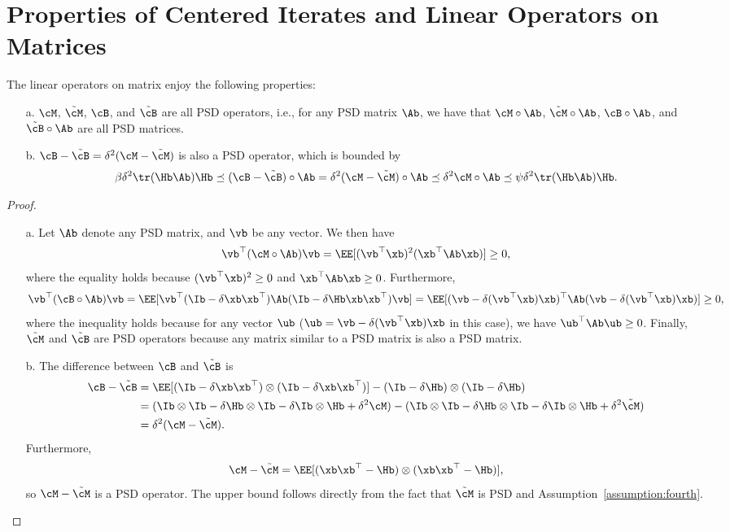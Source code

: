 \documentclass[11pt]{article}
\begin{document}
\section{Properties of Centered Iterates and Linear Operators on Matrices}\label{section:linear_operator_property}

\begin{lemma}\label{lemma:linear_operator_properties}
The linear operators on matrix enjoy the following properties:
\begin{itemize}[leftmargin=*]
\item[a.] $\cM$, $\tilde\cM$, $\cB$, and $\tilde\cB$ are all PSD operators, i.e., for any PSD matrix $\Ab$, we have that $\cM\circ\Ab$, $\tilde\cM\circ\Ab$, $\cB\circ\Ab$, and $\tilde\cB\circ\Ab$ are all PSD matrices.
\item[b.] $\cB-\tilde\cB=\delta^2(\cM-\tilde\cM)$ is also a PSD operator, which is bounded by
\begin{align*}
\beta\delta^2\tr(\Hb\Ab)\Hb\preceq(\cB-\tilde\cB)\circ\Ab=\delta^2(\cM-\tilde\cM)\circ\Ab\preceq\delta^2\cM\circ\Ab\preceq\psi\delta^2\tr(\Hb\Ab)\Hb.
\end{align*}
\end{itemize}
\end{lemma}
\begin{proof}
\begin{itemize}[leftmargin=*]
\item[a.] Let $\Ab$ denote any PSD matrix, and $\vb$ be any vector. We then have
\begin{align*}
\vb^\top(\cM\circ\Ab)\vb=\EE[(\vb^\top\xb)^2(\xb^\top\Ab\xb)]\ge0,
\end{align*}
where the equality holds because $(\vb^\top\xb)^2\ge0$ and $\xb^\top\Ab\xb\ge0$. Furthermore,
\begin{align*}
\vb^\top(\cB\circ\Ab)\vb=\EE[\vb^\top(\Ib-\delta\xb\xb^\top)\Ab(\Ib-\delta\Hb\xb\xb^\top)\vb]=\EE[(\vb-\delta(\vb^\top\xb)\xb)^\top\Ab(\vb-\delta(\vb^\top\xb)\xb)]\ge0,
\end{align*}
where the inequality holds because for any vector $\ub$ ($\ub=\vb-\delta(\vb^\top\xb)\xb$ in this case), we have $\ub^\top\Ab\ub\ge0$. Finally, $\tilde\cM$ and $\tilde\cB$ are PSD operators because any matrix similar to a PSD matrix is also a PSD matrix.
\item[b.] The difference between $\cB$ and $\tilde\cB$ is
\begin{align*}
\cB-\tilde\cB&=\EE[(\Ib-\delta\xb\xb^\top)\otimes(\Ib-\delta\xb\xb^\top)]-(\Ib-\delta\Hb)\otimes(\Ib-\delta\Hb)\\
&=(\Ib\otimes\Ib-\delta\Hb\otimes\Ib-\delta\Ib\otimes\Hb+\delta^2\cM)-(\Ib\otimes\Ib-\delta\Hb\otimes\Ib-\delta\Ib\otimes\Hb+\delta^2\tilde\cM)\\
&=\delta^2(\cM-\tilde\cM).
\end{align*}
Furthermore,
\begin{align*}
\cM-\tilde\cM=\EE[(\xb\xb^\top-\Hb)\otimes(\xb\xb^\top-\Hb)],
\end{align*}
so $\cM-\tilde\cM$ is a PSD operator. The upper bound follows directly from the fact that $\tilde\cM$ is PSD and Assumption~\ref{assumption:fourth}.
\end{itemize}
\end{proof}
\end{document}
